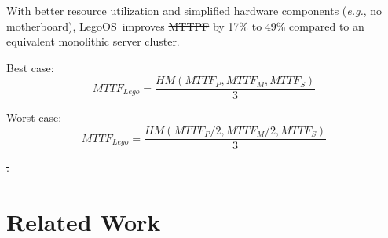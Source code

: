 \documentclass[10pt,times,twocolumn]{z2-article}
\newcommand{\boldparagraph}[1]{\vspace*{1ex}\noindent\textit{#1}\hspace{1em}}
\newcommand{\eg}{\textit{e.g.}}
\newcommand{\lego}{LegoOS}
\providecommand{\DIFaddtex}[1]{{\protect\color{blue}\uwave{#1}}} %
\providecommand{\DIFdeltex}[1]{{\protect\color{red}\sout{#1}}}                      %
\providecommand{\DIFaddbegin}{} %
\providecommand{\DIFaddend}{} %
\providecommand{\DIFdelbegin}{} %
\providecommand{\DIFdelend}{} %
\providecommand{\DIFadd}[1]{\texorpdfstring{\DIFaddtex{#1}}{#1}} %
\providecommand{\DIFdel}[1]{\texorpdfstring{\DIFdeltex{#1}}{}} %
\newcommand{\DIFscaledelfig}{0.5}
\newlength{\DIFdelgraphicswidth} %
\newlength{\DIFdelgraphicsheight} %
\newcommand{\DIFaddincludegraphics}[2][]{{\color{blue}\fbox{\DIFOincludegraphics[#1]{#2}}}} %
\newcommand{\DIFdelincludegraphics}[2][]{%
\sbox{\DIFdelgraphicsbox}{\DIFOincludegraphics[#1]{#2}}%
\settoboxwidth{\DIFdelgraphicswidth}{\DIFdelgraphicsbox} %
\settoboxtotalheight{\DIFdelgraphicsheight}{\DIFdelgraphicsbox} %
\scalebox{\DIFscaledelfig}{%
\parbox[b]{\DIFdelgraphicswidth}{\usebox{\DIFdelgraphicsbox}\\[-\baselineskip] \rule{\DIFdelgraphicswidth}{0em}}\llap{\resizebox{\DIFdelgraphicswidth}{\DIFdelgraphicsheight}{%
\setlength{\unitlength}{\DIFdelgraphicswidth}%
\begin{picture}(1,1)%
\thicklines\linethickness{2pt} %
{\color[rgb]{1,0,0}\put(0,0){\framebox(1,1){}}}%
{\color[rgb]{1,0,0}\put(0,0){\line( 1,1){1}}}%
{\color[rgb]{1,0,0}\put(0,1){\line(1,-1){1}}}%
\end{picture}%
}\hspace*{3pt}}} %
} %
\DeclareRobustCommand{\DIFaddbegin}{\DIFOaddbegin \let\includegraphics\DIFaddincludegraphics} %
\DeclareRobustCommand{\DIFaddend}{\DIFOaddend \let\includegraphics\DIFOincludegraphics} %
\DeclareRobustCommand{\DIFdelbegin}{\DIFOdelbegin \let\includegraphics\DIFdelincludegraphics} %
\DeclareRobustCommand{\DIFdelend}{\DIFOaddend \let\includegraphics\DIFOincludegraphics} %
\begin{document}
{{{{{{{With better resource utilization and simplified hardware components (\eg, no motherboard),
\lego\ improves \DIFdelbegin \DIFdel{MTTPF }\DIFdelend \DIFaddbegin \DIFadd{MTTF }\DIFaddend by 17\% to 49\% compared to an equivalent monolithic server cluster.

Best case:
\begin{equation}
MTTF_{Lego} = \frac{HM(MTTF_P, MTTF_M, MTTF_S)}{3}
\end{equation}

Worst case:
\begin{equation}
MTTF_{Lego} = \frac{HM(MTTF_P/2, MTTF_M/2, MTTF_S)}{3}
\end{equation}
\fi

\DIFdelbegin %
\DIFdel{.
}\DIFdelend \section{Related Work}
\label{sec:related}

}}}}}}}
\end{document}
